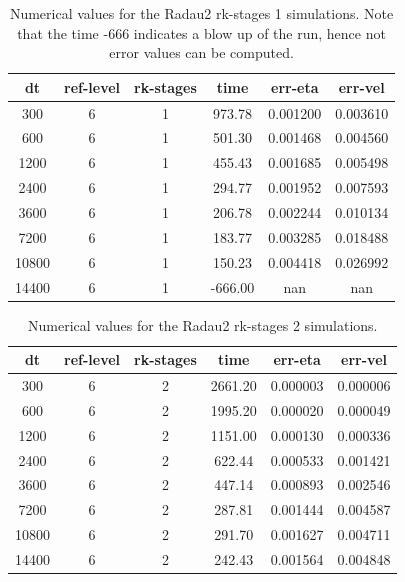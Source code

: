 \documentclass[a4paper, 12pt]{article}
\begin{document}
\begin{table}[h]\centering
\begin{tabular}{c|c|c|c|c|c}
dt    & ref-level &  rk-stages & time    & err-eta      &    err-vel \\ \hline
300    &      6   &       1 & 973.78 & 0.001200 & 0.003610 \\
600    &      6   &       1 & 501.30 & 0.001468 & 0.004560\\
1200   &       6   &       1 & 455.43 & 0.001685 & 0.005498\\
2400   &       6   &       1 & 294.77 & 0.001952 & 0.007593\\
3600    &      6    &      1 & 206.78 & 0.002244 & 0.010134\\
7200   &       6    &      1 & 183.77 & 0.003285 & 0.018488\\
10800   &       6   &       1 & 150.23 & 0.004418 & 0.026992\\
14400   &       6   &       1 &-666.00 & nan & nan
\end{tabular}
\caption{Numerical values for the Radau2 rk-stages 1 simulations.
Note that the time -666 indicates a blow up of the run, hence not error values can be computed.}
\end{table}




\begin{table}[h]\centering
\begin{tabular}{c|c|c|c|c|c}
dt    & ref-level &  rk-stages & time    & err-eta      &    err-vel \\ \hline
300   &        6   &        2 &  2661.20 &  0.000003 &  0.000006\\
600    &       6   &        2 &  1995.20 &  0.000020 &  0.000049\\
1200  &         6   &        2 &  1151.00 &  0.000130 &  0.000336\\
2400   &        6   &        2 &   622.44 &  0.000533 &  0.001421\\
3600   &        6   &        2 &   447.14 &  0.000893 &  0.002546\\
7200    &       6   &        2 &   287.81 &  0.001444 &  0.004587\\
10800   &        6  &         2 &   291.70 &  0.001627 &  0.004711\\
14400    &       6  &         2 &   242.43 &  0.001564 &  0.004848\\
\end{tabular}
\caption{Numerical values for the Radau2 rk-stages 2 simulations.}
\end{table}
\end{document}
